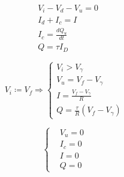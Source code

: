 \documentclass[../elettronica]{subfiles}
\begin{document}
\begin{tcolorbox}[title=Equazioni generali]
    \begin{align*}
        &V_i - V_d - V_u = 0\\
        &I_d + I_c = I\\
        &I_c = \frac{dQ_u}{dt}\\
        &Q = \tau I_D
    \end{align*}
\end{tcolorbox}
\begin{minipage}{.47\textwidth}
    \begin{tcolorbox}[title={$t<0$ Diodo on}]
        \[
            V_i \coloneqq V_f \Rightarrow
            \begin{cases}
                V_i > V_\gamma\\
                V_u = V_f - V_\gamma\\
                I = \frac{V_f - V_\gamma}{R}\\
                Q = \frac{\tau}{R}(V_f - V_\gamma)
            \end{cases}
        \]
    \end{tcolorbox}
\end{minipage}
\begin{minipage}{.47\textwidth}
    \begin{tcolorbox}[title={Circuito da $t > 0$ a $t \to \infty$}]
        \[\begin{cases}
        &V_u = 0\\
        &I_c = 0\\
        &I = 0\\
        &Q = 0
        \end{cases}
    \]
\end{tcolorbox}
\end{minipage}
\end{document}

